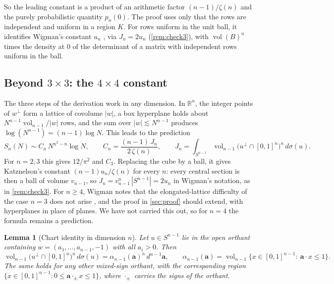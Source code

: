\documentclass[11pt]{article}
\newtheorem{lemma}[theorem]{Lemma}
\theoremstyle{definition}
\newcommand{\R}{\mathbb{R}}
\newcommand{\abs}[1]{\left\lvert #1 \right\rvert}
\begin{document}
So the leading constant is a product of an arithmetic factor $(n-1)/\zeta(n)$ and the purely probabilistic quantity $p_n(0)$. The proof uses only that the rows are independent and uniform in a region $K$. For rows uniform in the unit ball, it identifies Wigman's constant $u_n$ \cite{Wigman}, via $J_n=2u_n$ (\cref{rem:check3}), with $\operatorname{vol}(B)^n$ times the density at $0$ of the determinant of a matrix with independent rows uniform in the ball.

\subsection{Beyond \texorpdfstring{$3\times3$}{3x3}: the \texorpdfstring{$4\times4$}{4x4} constant}\label{sec:4x4}

The three steps of the derivation work in any dimension. In $\R^n$, the integer points of $w^\perp$ form a lattice of covolume $\abs w$, a box hyperplane holds about $N^{n-1}\operatorname{vol}_{n-1}/\abs w$ rows, and the sum over $\abs w\lesssim N^{n-1}$ produces $\log(N^{n-1})=(n-1)\log N$. This leads to the prediction
\begin{equation}\label{eq:generaln}
S_n(N)\sim C_n\,N^{n^2-n}\log N,\qquad C_n=\frac{(n-1)\,J_n}{2\,\zeta(n)},\qquad
J_n=\int_{S^{n-1}}\operatorname{vol}_{n-1}\bigl(u^\perp\cap[0,1]^n\bigr)^n\,d\sigma(u).
\end{equation}
For $n=2,3$ this gives $12/\pi^2$ and $C_3$. Replacing the cube by a ball, it gives Katznelson's constant $(n-1)u_n/\zeta(n)$ for every $n$: every central section is then a ball of volume $v_{n-1}$, so $J_n=v_{n-1}^n\,\abs{S^{n-1}}=2u_n$ in Wigman's notation, as in \cref{rem:check3}. For $n\ge4$, Wigman notes that the elongated-lattice difficulty of the case $n=3$ does not arise \cite[\S1.3]{Wigman}, and the proof in \cref{sec:proof} should extend, with hyperplanes in place of planes. We have not carried this out, so for $n=4$ the formula remains a prediction.

\begin{lemma}[Chart identity in dimension $n$]\label{lem:chartn}
Let $u\in S^{n-1}$ lie in the open orthant containing $w=(a_1,\dots,a_{n-1},-1)$ with all $a_i>0$. Then
\[
\operatorname{vol}_{n-1}\bigl(u^\perp\cap[0,1]^n\bigr)^n\,d\sigma(u)=\alpha_{n-1}(\boldsymbol a)^n\,d^{n-1}\boldsymbol a,
\qquad
\alpha_{n-1}(\boldsymbol a)=\operatorname{vol}_{n-1}\bigl\{x\in[0,1]^{n-1}:\ \boldsymbol a\cdot x\le1\bigr\}.
\]
The same holds for any other mixed-sign orthant, with the corresponding region $\{x\in[0,1]^{n-1}: 0\le \boldsymbol a\cdot_{\pm}x\le 1\}$, where $\cdot_\pm$ carries the signs of the orthant.
\end{lemma}
\end{document}
